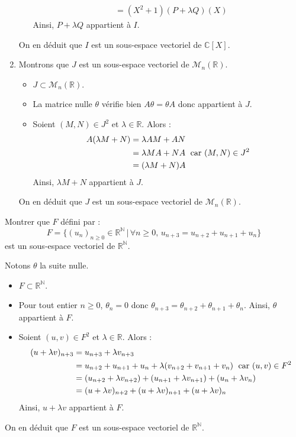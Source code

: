 \documentclass[a4paper,10pt]{report}
\begin{document}
\begin{enumerate}
\begin{itemize}
\begin{align*}
& = (X^2+1)(P+\lambda Q)(X)
\end{align*}
Ainsi, $P+ \lambda Q$ appartient à $I$.
\end{itemize}
On en déduit que $I$ est un sous-espace vectoriel de $\mathbb{C}[X]$.
\item Montrons que $J$ est un sous-espace vectoriel de $\mathcal{M}_n(\mathbb{R})$.
\begin{itemize}
\item $J \subset \mathcal{M}_n(\mathbb{R})$.
\item La matrice nulle $\theta$ vérifie bien $A \theta = \theta A$ donc appartient à $J$.
\item Soient $(M,N) \in J^2$ et $\lambda \in \mathbb{R}$. Alors :
\begin{align*}
A(\lambda M + N) & = \lambda AM + AN \\
& = \lambda MA + NA \; \hbox{ car } (M,N) \in J^2 \\
& = (\lambda M+N) A 
\end{align*}
Ainsi, $\lambda M +N$ appartient à $J$.
\end{itemize}
On en déduit que $J$ est un sous-espace vectoriel de $\mathcal{M}_n(\mathbb{R})$.
\end{enumerate}

\medskip



\begin{Exa} Montrer que $F$ défini par :
$$ F = \lbrace (u_n)_{n \geq 0} \in \mathbb{R}^{\mathbb{N}} \, \vert \, \forall n \geq 0, \, u_{n+3}=u_{n+2}+u_{n+1}+u_n \rbrace$$
est un sous-espace vectoriel de $\mathbb{R}^{\mathbb{N}}$.
\end{Exa}

\corr Notons $\theta$ la suite nulle.

\begin{itemize}
\item $F \subset \mathbb{R}^{\mathbb{N}}$.
\item Pour tout entier $n \geq 0$, $\theta_n = 0$ donc $\theta_{n+3} = \theta_{n+2} + \theta_{n+1} + \theta_n$. Ainsi, $\theta$ appartient à $F$.
\item Soient $(u,v) \in F^2$ et $\lambda \in \mathbb{R}$. Alors :
\begin{align*}
(u+\lambda v)_{n+3} & = u_{n+3} + \lambda v_{n+3} \\
& = u_{n+2}+u_{n+1}+u_n + \lambda (v_{n+2}+v_{n+1}+v_n) \; \hbox{ car } (u,v) \in F^2 \\
& = (u_{n+2} + \lambda v_{n+2}) + (u_{n+1} + \lambda v_{n+1}) + (u_n + \lambda v_n) \\
& = (u+\lambda v)_{n+2} + (u+\lambda v)_{n+1} + (u+\lambda v)_{n}
\end{align*}
Ainsi, $u+ \lambda v$ appartient à $F$.
\end{itemize}
On en déduit que $F$ est un sous-espace vectoriel de $\mathbb{R}^{\mathbb{N}}$.
\end{document}
